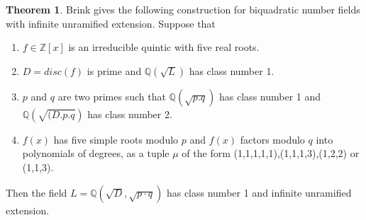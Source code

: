 \documentclass[12pt]{extarticle}
\newcommand{\Q}{\mathbb{Q}}
\newcommand{\Z}{\mathbb{Z}}
\newcommand{\<}{\langle}
\renewcommand{\>}{\rangle}
\theoremstyle{definition}
\newtheorem{theorem}{Theorem}
\begin{document}
\begin{theorem}
\label{thm:brink}
Brink \cite{BRINK} gives the following construction for 
biquadratic number fields with infinite unramified extension. 
Suppose that \begin{enumerate}
    \item $f\in \Z[x]$ is an irreducible quintic with five real roots.
    \item $D = disc(f)$ is prime and $\Q(\sqrt{L})$ has class number 1.
    \item $p$ and $q$ are two primes such that $\Q(\sqrt{p.q})$ has class number 1 and $\Q\left(\sqrt{(D.p.q}\right)$ has class number 2.
    \item $f(x)$ has five simple roots modulo $p$ and $f(x)$ factors modulo $q$ into polynomials of degrees, as a tuple $\mu$ of the form (1,1,1,1,1),(1,1,1,3),(1,2,2) or (1,1,3).
\end{enumerate}
Then the field $L=\Q\left(\sqrt{D},\sqrt{p \cdot q}\right)$ has class number 1 and infinite unramified extension.
\end{theorem}
\end{document}
